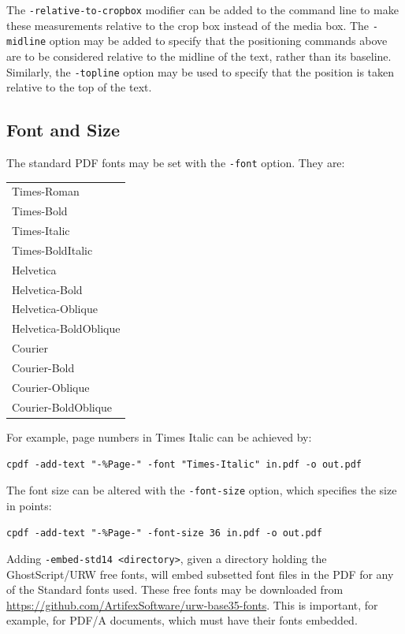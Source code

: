 \documentclass{book}
\begin{document}
The \texttt{-relative-to-cropbox} modifier can be added to the command line to
make these measurements relative to the crop box instead of the media box. The \texttt{-midline} option may be added to specify that the positioning
commands above are to be considered relative to the midline of the text, rather
than its baseline. Similarly, the \texttt{-topline} option may be used to specify that the position is taken relative to the top of the text.

  \subsection{Font and Size}
\label{fonts}
  The standard PDF fonts may be set with the \texttt{-font} option. They are:

  \vspace{2mm}
  \begin{tabular}{l}
  Times-Roman\\
  Times-Bold\\
  Times-Italic\\
  Times-BoldItalic\\
  Helvetica\\
  Helvetica-Bold\\
  Helvetica-Oblique\\
  Helvetica-BoldOblique\\
  Courier\\
  Courier-Bold\\
  Courier-Oblique\\
  Courier-BoldOblique
  \end{tabular}
 \vspace{2mm}

  \noindent For example, page numbers in Times Italic can be achieved by:
  \begin{framed}
    \noindent\small\verb!cpdf -add-text "-%Page-" -font "Times-Italic" in.pdf -o out.pdf!
  \end{framed}

\noindent The font size can be altered with the \texttt{-font-size} option, which
specifies the size in points:
  \begin{framed}
    \noindent\small\verb!cpdf -add-text "-%Page-" -font-size 36 in.pdf -o out.pdf!
  \end{framed}

  \noindent Adding \texttt{-embed-std14 <directory>}, given a directory holding the GhostScript/URW free fonts, will embed subsetted font files in the PDF for any of the Standard fonts used. These free fonts may be downloaded from \url{https://github.com/ArtifexSoftware/urw-base35-fonts}. This is important, for example, for PDF/A documents, which must have their fonts embedded.
\end{document}
